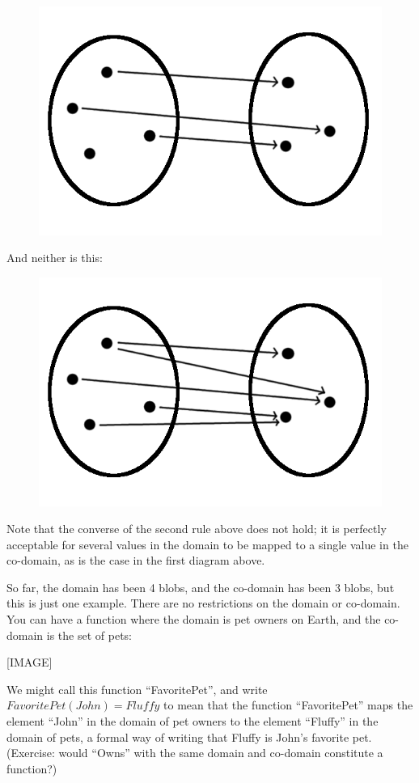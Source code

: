\documentclass[UTF8]{book}
\begin{document}
\begin{CJK}{UTF8}{gbsn}
\begin{figure}[H]
\centering
\includegraphics[width=0.8\linewidth]{function_undefined}
\end{figure}

And neither is this:

\begin{figure}[H]
\centering
\includegraphics[width=0.8\linewidth]{function_multifunction}
\end{figure}

Note that the converse of the second rule above does not hold; it is perfectly acceptable for several values in the domain to be mapped to a single value in the co-domain, as is the case in the first diagram above.

So far, the domain has been 4 blobs, and the co-domain has been 3 blobs, but this is just one example. There are no restrictions on the domain or co-domain. You can have a function where the domain is pet owners on Earth, and the co-domain is the set of pets:

[IMAGE]

We might call this function ``FavoritePet'', and write $FavoritePet(John) = Fluffy$ to mean that the function ``FavoritePet'' maps the element ``John'' in the domain of pet owners to the element ``Fluffy'' in the domain of pets, a formal way of writing that Fluffy is John's favorite pet. (Exercise: would ``Owns'' with the same domain and co-domain constitute a function?)


\end{CJK}
\end{document}

